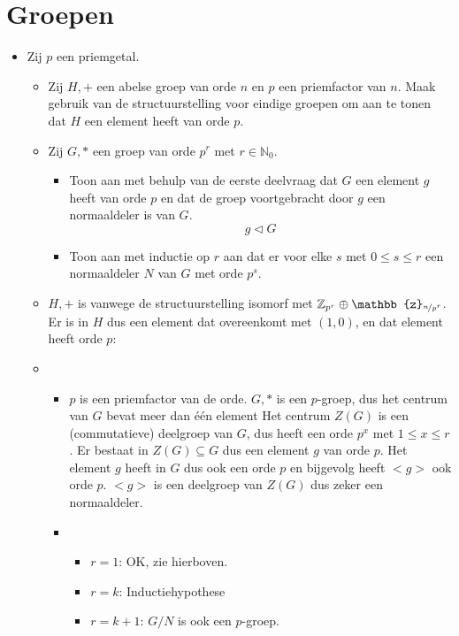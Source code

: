 \documentclass[main.tex]{subfiles}
\begin{document}
\section{Groepen}
\label{sec:groepen}

\begin{itemize}
\item 
  Zij $p$ een priemgetal.
  \begin{itemize}
  \item Zij $H,+$ een abelse groep van orde $n$ en $p$ een priemfactor van $n$.
    Maak gebruik van de structuurstelling voor eindige groepen om aan te tonen dat $H$ een element heeft van orde $p$.
  \item Zij $G,*$ een groep van orde $p^{r}$ met $r\in \mathbb{N}_{0}$.
    \begin{itemize}
    \item Toon aan met behulp van de eerste deelvraag dat $G$ een element $g$ heeft van orde $p$ en dat de groep voortgebracht door $g$ een normaaldeler is van $G$.
      \[ g \triangleleft G \]
    \item 
      Toon aan met inductie op $r$ aan dat er voor elke $s$ met $0\le s \le r$ een normaaldeler $N$ van $G$ met orde $p^{s}$.
    \end{itemize}
  \end{itemize}
  \begin{itemize}
  \item $H,+$ is vanwege de structuurstelling isomorf met
    $\mathbb{Z}_{p^{r}} \oplus \mathbb{z}_{\nicefrac{n}{p^{r}}}$.  Er
    is in $H$ dus een element dat overeenkomt met $(1,0)$, en dat
    element heeft orde $p$:
  \item
    \begin{itemize}
    \item $p$ is een priemfactor van de orde.
      $G,*$ is een $p$-groep, dus het centrum van $G$ bevat meer dan \'e\'en element
      Het centrum $Z(G)$ is een (commutatieve) deelgroep van $G$, dus heeft een orde $p^{x}$ met $1\le x\le r$.
      Er bestaat in $Z(G) \subseteq G$ dus een element $g$ van orde $p$.
      Het element $g$ heeft in $G$ dus ook een orde $p$ en bijgevolg heeft $<g>$ ook orde $p$.
      $<g>$ is een deelgroep van $Z(G)$ dus zeker een normaaldeler.
    \item 
      \begin{itemize}
      \item $r = 1$: OK, zie hierboven.
      \item $r = k$: Inductiehypothese
      \item $r = k+1$:
        $G/N$ is ook een $p$-groep.
      \end{itemize}
    \end{itemize}
  \end{itemize}

\end{itemize}
\end{document}

